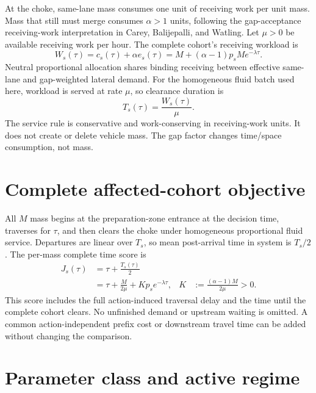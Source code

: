 \documentclass[11pt]{article}
\begin{document}
At the choke, same-lane mass consumes one unit of receiving work per unit mass.
Mass that still must merge consumes \(\alpha>1\) units, following the
gap-acceptance receiving-work interpretation in Carey, Balijepalli, and Watling.
Let \(\mu>0\) be available receiving work per hour. The complete cohort's
receiving workload is
\begin{equation}
 W_s(\tau)=c_s(\tau)+\alpha e_s(\tau)
 =M+(\alpha-1)p_sM e^{-\lambda\tau}.
 \label{eq:work}
\end{equation}
Neutral proportional allocation shares binding receiving between effective
same-lane and gap-weighted lateral demand. For the homogeneous fluid batch used
here, workload is served at rate \(\mu\), so clearance duration is
\begin{equation}
 T_s(\tau)=\frac{W_s(\tau)}{\mu}.
 \label{eq:clear}
\end{equation}
The service rule is conservative and work-conserving in receiving-work units.
It does not create or delete vehicle mass. The gap factor changes time/space
consumption, not mass.

\section{Complete affected-cohort objective}

All \(M\) mass begins at the preparation-zone entrance at the decision time,
traverses for \(\tau\), and then clears the choke under homogeneous proportional
fluid service. Departures are linear over \(T_s\), so mean post-arrival time in
system is \(T_s/2\). The per-mass complete time score is
\begin{align}
 J_s(\tau)
 &=\tau+\frac{T_s(\tau)}{2} \\
 &=\tau+\frac{M}{2\mu}
   +Kp_s e^{-\lambda\tau},
 &K&:=\frac{(\alpha-1)M}{2\mu}>0.
 \label{eq:objective}
\end{align}
This score includes the full action-induced traversal delay and the time until
the complete cohort clears. No unfinished demand or upstream waiting is omitted.
A common action-independent prefix cost or downstream travel time can be added
without changing the comparison.

\section{Parameter class and active regime}
\end{document}
